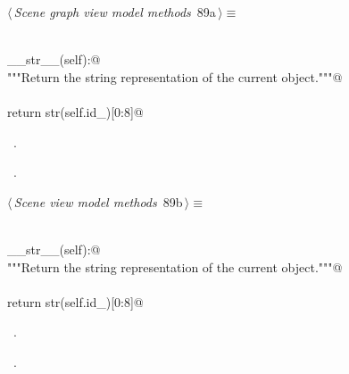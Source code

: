 \documentclass[
    a4paper,      %
    10pt,         %
    openright,    %
    notitlepage,  %
    parskip=half, %
]{scrreprt}       %
\theoremstyle{definition}                    %
\begin{document}
\begin{flushleft} \small
\begin{minipage}{\linewidth}\label{scrap141}\raggedright\small
{} $\langle\,${\itshape Scene graph view model methods}\nobreak\ {\footnotesize {89a}}$\,\rangle\equiv$
\vspace{-1exm}
\begin{list}{}{} \item
\mbox{}\lstinline@@\\
\mbox{}\lstinline@def __str__(self):@\\
\mbox{}\lstinline@    """Return the string representation of the current object."""@\\
\mbox{}\lstinline@@\\
\mbox{}\lstinline@    return str(self.id_)[0:8]@\\
\mbox{}\lstinline@@{\NWsep}
\end{list}
\vspace{-1.5ex}
\footnotesize
\begin{list}{}{\setlength{\itemsep}{-\parsep}\setlength{\itemindent}{-\leftmargin}}
\item \NWtxtMacroDefBy\ .
\item \NWtxtMacroRefIn\ .

\item{}
\end{list}
\end{minipage}\vspace{4ex}
\end{flushleft}
\begin{flushleft} \small
\begin{minipage}{\linewidth}\label{scrap142}\raggedright\small
{} $\langle\,${\itshape Scene view model methods}\nobreak\ {\footnotesize {89b}}$\,\rangle\equiv$
\vspace{-1exm}
\begin{list}{}{} \item
\mbox{}\lstinline@@\\
\mbox{}\lstinline@def __str__(self):@\\
\mbox{}\lstinline@    """Return the string representation of the current object."""@\\
\mbox{}\lstinline@@\\
\mbox{}\lstinline@    return str(self.id_)[0:8]@\\
\mbox{}\lstinline@@{\NWsep}
\end{list}
\vspace{-1.5ex}
\footnotesize
\begin{list}{}{\setlength{\itemsep}{-\parsep}\setlength{\itemindent}{-\leftmargin}}
\item \NWtxtMacroDefBy\ .
\item \NWtxtMacroRefIn\ .

\item{}
\end{list}
\end{minipage}\vspace{4ex}
\end{flushleft}
\end{document}
